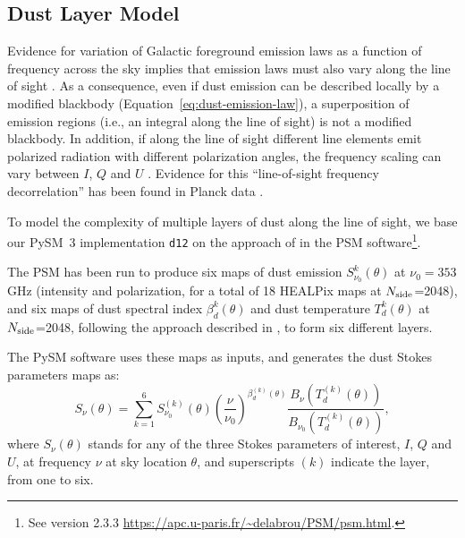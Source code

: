 \documentclass[twocolumn]{aastex631}
\begin{document}
\subsection{Dust Layer Model} \label{sec:layers}
Evidence for variation of Galactic foreground emission laws as a function of frequency across the sky implies that emission laws must also vary along the line of sight \citep[e.g.,][]{Krachmalnicoff:2018, SPIDERCollaboration:2024}. As a consequence, even if dust emission can be described locally by a modified blackbody (Equation~\ref{eq:dust-emission-law}), a superposition of emission regions (i.e., an integral along the line of sight) is not a modified blackbody. In addition, if along the line of sight different line elements emit polarized radiation with different polarization angles, the frequency scaling can vary between $I$, $Q$ and $U$ \citep{Tassis:2015}. Evidence for this ``line-of-sight frequency decorrelation'' has been found in Planck data \citep{Pelgrims:2021}.

To model the complexity of multiple layers of dust along the line of sight, we base our PySM~3 implementation \texttt{d12} on the approach of \cite{Martinez-Solaeche:2018} in the PSM software\footnote{See version 2.3.3 \url{https://apc.u-paris.fr/~delabrou/PSM/psm.html}.}. 

The PSM has been run to produce six maps of dust emission $S_{\nu_0}^k(\theta)$ at $\nu_0 = 353$ GHz (intensity and polarization, for a total of 18 HEALPix maps at $N_{\rm side}$=2048), and six maps of dust spectral index $\beta_d^k(\theta)$ and dust temperature $T_d^k(\theta)$ at $N_{\rm side}$=2048, following the approach described in \cite{Martinez-Solaeche:2018}, to form six different layers.

The PySM software uses these maps as inputs, and generates the dust Stokes parameters maps as:
\begin{equation}
    S_\nu(\theta) = \sum_{k=1}^6 S^{(k)}_{\nu_0}(\theta)
    \left( \frac{\nu}{\nu_0} \right)^{\beta^{(k)}_d(\theta)}
    \frac{B_\nu(T^{(k)}_d(\theta))}{B_{\nu_0}(T^{(k)}_d(\theta))},
\end{equation}
where $S_\nu(\theta)$ stands for any of the three Stokes parameters of interest, $I$, $Q$ and $U$, at frequency $\nu$ at sky location $\theta$, and superscripts ${(k)}$ indicate the layer, from one to six.
\end{document}
